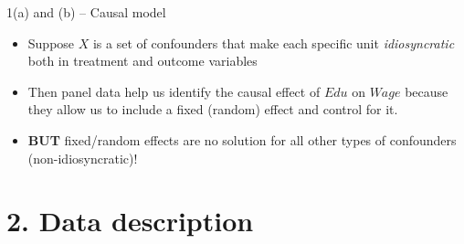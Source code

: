 \documentclass[xcolor=table,dvipsnames]{beamer}
\begin{document}
\begin{frame}{1(a) and (b) -- Causal model}
\begin{center}
  \pause
\end{center}
\begin{itemize}
\item Suppose $X$ is a set of confounders that make each specific unit \textit{idiosyncratic} both in treatment and outcome variables \pause
\item Then panel data help us identify the causal effect of $Edu$ on $Wage$ because they allow us to include a fixed (random) effect and control for it. \pause
\item \textbf{BUT} fixed/random effects are no solution for all other types of confounders (non-idiosyncratic)!
\end{itemize}
\end{frame}

\section{2. Data description}
\end{document}

